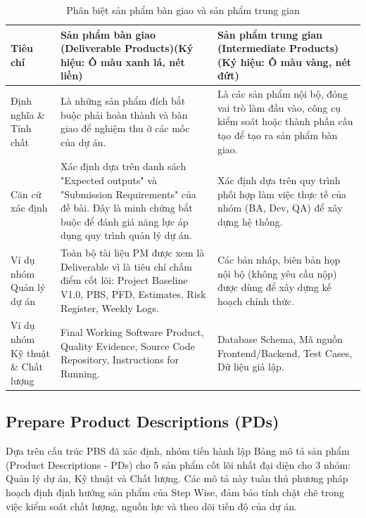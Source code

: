 \documentclass{article}
\begin{document}
\begin{table}[H]
\centering
\caption{Phân biệt sản phẩm bàn giao và sản phẩm trung gian}
\small
\renewcommand{\arraystretch}{1.25}
\begin{tabularx}{\textwidth}{|p{2cm}|>{\raggedright\arraybackslash}X|>{\raggedright\arraybackslash}X|}
\hline
\textbf{Tiêu chí} & \textbf{Sản phẩm bàn giao (Deliverable Products)(Ký hiệu: Ô màu xanh lá, nét liền)} & \textbf{Sản phẩm trung gian (Intermediate Products)(Ký hiệu: Ô màu vàng, nét đứt)} \\ \hline
Định nghĩa \& Tính chất & Là những sản phẩm đích bắt buộc phải hoàn thành và bàn giao để nghiệm thu ở các mốc của dự án. & Là các sản phẩm nội bộ, đóng vai trò làm đầu vào, công cụ kiểm soát hoặc thành phần cấu tạo để tạo ra sản phẩm bàn giao. \\ \hline
Căn cứ xác định & Xác định dựa trên danh sách "Expected outputs" và "Submission Requirements" của đề bài. Đây là minh chứng bắt buộc để đánh giá năng lực áp dụng quy trình quản lý dự án. & Xác định dựa trên quy trình phối hợp làm việc thực tế của nhóm (BA, Dev, QA) để xây dựng hệ thống. \\ \hline
Ví dụ nhóm Quản lý dự án & Toàn bộ tài liệu PM được xem là Deliverable vì là tiêu chí chấm điểm cốt lõi: Project Baseline V1.0, PBS, PFD, Estimates, Risk Register, Weekly Logs. & Các bản nháp, biên bản họp nội bộ (không yêu cầu nộp) được dùng để xây dựng kế hoạch chính thức. \\ \hline
Ví dụ nhóm Kỹ thuật \& Chất lượng & Final Working Software Product, Quality Evidence, Source Code Repository, Instructions for Running. & Database Schema, Mã nguồn Frontend/Backend, Test Cases, Dữ liệu giả lập. \\ \hline
\end{tabularx}
\end{table}

\subsection{Prepare Product Descriptions (PDs)}


Dựa trên cấu trúc PBS đã xác định, nhóm tiến hành lập Bảng mô tả sản phẩm (Product Descriptions - PDs) cho 5 sản phẩm cốt lõi nhất đại diện cho 3 nhóm: Quản lý dự án, Kỹ thuật và Chất lượng. Các mô tả này tuân thủ phương pháp hoạch định định hướng sản phẩm của Step Wise, đảm bảo tính chặt chẽ trong việc kiểm soát chất lượng, nguồn lực và theo dõi tiến độ của dự án.
\end{document}
